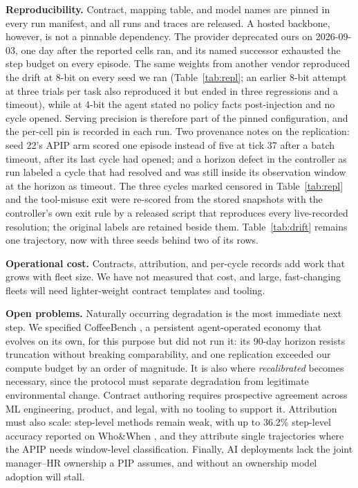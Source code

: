\documentclass[conference]{IEEEtran}
\begin{document}
\textbf{Reproducibility.} Contract, mapping table, and model names are pinned in every run manifest, and all runs and traces are released. A hosted backbone, however, is not a pinnable dependency. The provider deprecated ours on 2026-09-03, one day after the reported cells ran, and its named successor exhausted the step budget on every episode. The same weights from another vendor reproduced the drift at 8-bit on every seed we ran (Table~\ref{tab:repl}; an earlier 8-bit attempt at three trials per task also reproduced it but ended in three regressions and a timeout), while at 4-bit the agent stated no policy facts post-injection and no cycle opened. Serving precision is therefore part of the pinned configuration, and the per-cell pin is recorded in each run. Two provenance notes on the replication: seed 22's APIP arm scored one episode instead of five at tick 37 after a batch timeout, after its last cycle had opened; and a horizon defect in the controller as run labeled a cycle that had resolved and was still inside its observation window at the horizon as timeout. The three cycles marked censored in Table~\ref{tab:repl} and the tool-misuse exit were re-scored from the stored snapshots with the controller's own exit rule by a released script that reproduces every live-recorded resolution; the original labels are retained beside them. Table~\ref{tab:drift} remains one trajectory, now with three seeds behind two of its rows.

\textbf{Operational cost.} Contracts, attribution, and per-cycle records add work that grows with fleet size. We have not measured that cost, and large, fast-changing fleets will need lighter-weight contract templates and tooling.

\textbf{Open problems.} Naturally occurring degradation is the most immediate next step. We specified CoffeeBench \cite{ref20}, a persistent agent-operated economy that evolves on its own, for this purpose but did not run it: its 90-day horizon resists truncation without breaking comparability, and one replication exceeded our compute budget by an order of magnitude. It is also where \emph{recalibrated} becomes necessary, since the protocol must separate degradation from legitimate environmental change. Contract authoring requires prospective agreement across ML engineering, product, and legal, with no tooling to support it. Attribution must also scale: step-level methods remain weak, with up to 36.2\% step-level accuracy reported on Who\&When \cite{ref15}, and they attribute single trajectories where the APIP needs window-level classification. Finally, AI deployments lack the joint manager--HR ownership a PIP assumes, and without an ownership model adoption will stall.
\end{document}
